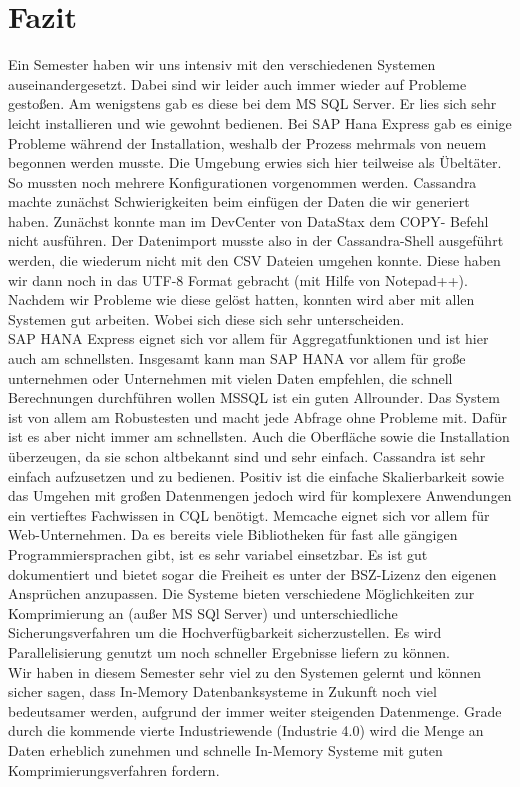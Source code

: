 \documentclass[a4paper, 12pt]{scrartcl}
\begin{document}
\section{Fazit}
Ein Semester haben wir uns intensiv mit den verschiedenen Systemen auseinandergesetzt. Dabei sind wir leider auch immer wieder auf Probleme gestoßen. Am wenigstens gab es diese bei dem MS SQL Server. Er lies sich sehr leicht installieren und wie gewohnt bedienen. Bei SAP Hana Express gab es einige Probleme während der Installation, weshalb der Prozess mehrmals von neuem begonnen werden musste. Die Umgebung erwies sich hier teilweise als Übeltäter. So mussten noch mehrere Konfigurationen vorgenommen werden. Cassandra machte zunächst Schwierigkeiten beim einfügen der Daten die wir generiert haben. Zunächst konnte man im DevCenter von DataStax dem COPY- Befehl nicht ausführen. Der Datenimport musste also in der Cassandra-Shell ausgeführt werden, die wiederum nicht mit den CSV Dateien umgehen konnte. Diese haben wir dann noch in das UTF-8 Format gebracht (mit Hilfe von Notepad++). Nachdem wir Probleme wie diese gelöst hatten, konnten wird aber mit allen Systemen gut arbeiten. Wobei sich diese sich sehr unterscheiden.\\
SAP HANA Express eignet sich vor allem für Aggregatfunktionen 
und ist hier auch am schnellsten. Insgesamt kann man SAP HANA vor allem für große unternehmen oder Unternehmen mit vielen Daten empfehlen, die schnell Berechnungen durchführen wollen
MSSQL ist ein guten Allrounder. 
Das System ist von allem am Robustesten und macht jede Abfrage ohne Probleme mit. Dafür ist es aber nicht immer am schnellsten. Auch die Oberfläche sowie die Installation überzeugen, da sie schon altbekannt sind und sehr einfach.
Cassandra ist sehr einfach aufzusetzen und zu bedienen.
Positiv ist die einfache Skalierbarkeit sowie das Umgehen mit großen Datenmengen jedoch wird für komplexere Anwendungen ein vertieftes Fachwissen in CQL benötigt. 
Memcache eignet sich vor allem für Web-Unternehmen. 
Da es bereits viele Bibliotheken für fast alle gängigen Programmiersprachen gibt, ist es sehr variabel einsetzbar. Es ist gut dokumentiert und bietet sogar die Freiheit es unter der BSZ-Lizenz den eigenen Ansprüchen anzupassen.
Die Systeme bieten verschiedene Möglichkeiten zur Komprimierung an (außer MS SQl Server) und unterschiedliche Sicherungsverfahren um die Hochverfügbarkeit sicherzustellen. Es wird Parallelisierung genutzt um noch schneller Ergebnisse liefern zu können.\\ Wir haben in diesem Semester sehr viel zu den Systemen gelernt und können sicher sagen, dass In-Memory Datenbanksysteme in Zukunft noch viel bedeutsamer werden, aufgrund der immer weiter steigenden Datenmenge. Grade durch die kommende vierte Industriewende (Industrie 4.0) wird die Menge an Daten erheblich zunehmen und schnelle In-Memory Systeme mit guten Komprimierungsverfahren fordern.
\end{document}
